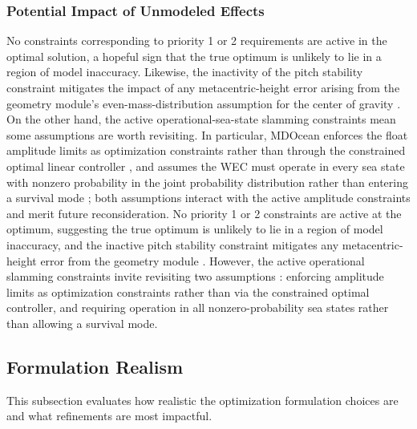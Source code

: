 \subsubsection{Potential Impact of Unmodeled Effects}
\ifdefined\DISSERTATION
    No constraints corresponding to priority 1 or 2 requirements are active in the optimal solution, %
    a hopeful sign that the true optimum is unlikely to lie in a region of model inaccuracy.
    Likewise, the inactivity of the pitch stability constraint mitigates the impact of any metacentric-height error arising from the geometry module's even-mass-distribution assumption for the center of gravity \cite{mccabe_development_2026}.
    On the other hand, the active operational-sea-state slamming constraints mean some assumptions are worth revisiting.
    In particular, MDOcean enforces the float amplitude limits as optimization constraints rather than through the constrained optimal linear controller \cite{mccabe_development_2026}, and assumes the WEC must operate in every sea state with nonzero probability in the joint probability distribution rather than entering a survival mode \cite{mccabe_development_2026}; both assumptions interact with the active amplitude constraints and merit future reconsideration.
\else
    No priority 1 or 2 constraints are active at the optimum, suggesting the true optimum is unlikely to lie in a region of model inaccuracy, and the inactive pitch stability constraint mitigates any metacentric-height error from the geometry module \cite{mccabe_development_2026}.
    However, the active operational slamming constraints invite revisiting two assumptions \cite{mccabe_development_2026}: enforcing amplitude limits as optimization constraints rather than via the constrained optimal controller, and requiring operation in all nonzero-probability sea states rather than allowing a survival mode.
\fi

\subsection{Formulation Realism}
This subsection evaluates how realistic the optimization formulation choices are and what refinements are most impactful.

